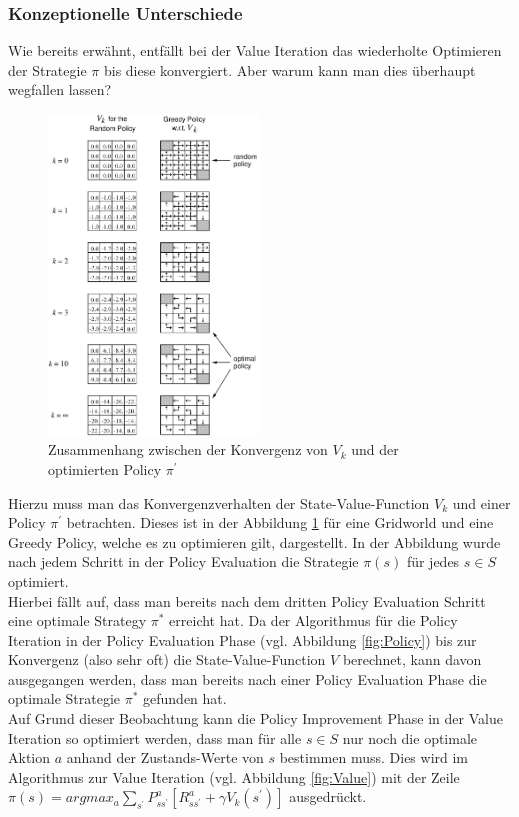 \documentclass[10pt]{scrartcl}
\begin{document}
\subsubsection{Konzeptionelle Unterschiede}
Wie bereits erwähnt, entfällt bei der Value Iteration das wiederholte Optimieren der Strategie $\pi$ bis diese konvergiert.
Aber warum kann man dies überhaupt wegfallen lassen?\\

\begin{figure}[htbp]
	\centering	\includegraphics[width=0.5\textwidth]{Bilder/KonvergenzVkPolicy}
	\caption{Zusammenhang zwischen der Konvergenz von $V_{k}$ und der optimierten Policy $\pi^{'}$ }
	\label{fig:konvergenz}
\end{figure}

Hierzu muss man das Konvergenzverhalten der State-Value-Function $V_{k}$ und einer Policy $\pi^{'}$ betrachten.
Dieses ist in der Abbildung \ref{fig:konvergenz} für eine Gridworld und eine Greedy Policy, welche es zu optimieren gilt, dargestellt.
In der Abbildung wurde nach jedem Schritt in der Policy Evaluation die Strategie $\pi(s)$ für jedes $s \in S$ optimiert.\\
Hierbei fällt auf, dass man bereits nach dem dritten Policy Evaluation Schritt eine optimale Strategy $\pi^{*}$ erreicht hat. 
Da der Algorithmus für die Policy Iteration in der Policy Evaluation Phase (vgl. Abbildung \ref{fig:Policy}) bis zur Konvergenz (also sehr oft) die State-Value-Function $V$ berechnet, kann davon ausgegangen werden, dass man bereits nach einer Policy Evaluation Phase die optimale Strategie $\pi^{*}$ gefunden hat.\\
Auf Grund dieser Beobachtung kann die Policy Improvement Phase in der Value Iteration so optimiert werden, dass man für alle $s \in S$ nur noch die optimale Aktion $a$ anhand der Zustands-Werte von $s$ bestimmen muss.
Dies wird im Algorithmus zur Value Iteration (vgl. Abbildung \ref{fig:Value}) mit der Zeile $\pi(s) = argmax_{a} \sum_{s^{'}} P^a_{ss^{'}} [R^a_{ss^{'}} + \gamma V_{k} (s^{'})]$ ausgedrückt.\\
\end{document}
